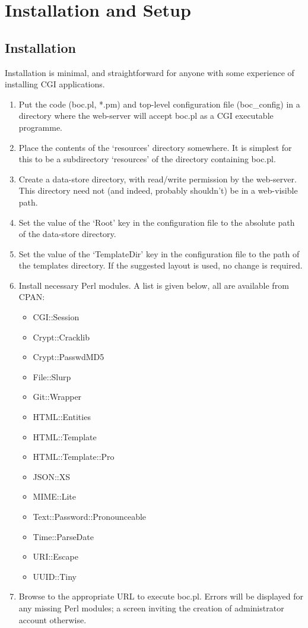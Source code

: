 \documentclass{report}
\begin{document}
\chapter{Installation and Setup}

\section{Installation}

Installation is minimal, and straightforward for anyone with some experience of installing CGI applications.

\begin{enumerate}
\item Put the code (boc.pl, *.pm) and top-level configuration file (boc\_config) in a directory where the web-server will accept boc.pl as a CGI executable programme.
\item Place the contents of the `resources' directory somewhere.  It is simplest for this to be a subdirectory `resources' of the directory containing boc.pl.
\item Create a data-store directory, with read/write permission by the web-server.  This directory need not (and indeed, probably shouldn't) be in a web-visible path.
\item Set the value of the `Root' key in the configuration file to the absolute path of the data-store directory.
\item Set the value of the `TemplateDir' key in the configuration file to the path of the templates directory.  If the suggested layout is used, no change is required.
\item Install necessary Perl modules.  A list is given below, all are available from CPAN:
	\begin{itemize}
	\item CGI::Session
	\item Crypt::Cracklib
	\item Crypt::PasswdMD5
	\item File::Slurp
	\item Git::Wrapper
	\item HTML::Entities
	\item HTML::Template
	\item HTML::Template::Pro
	\item JSON::XS
	\item MIME::Lite
	\item Text::Password::Pronounceable
	\item Time::ParseDate
	\item URI::Escape
	\item UUID::Tiny
	\end{itemize}
\item Browse to the appropriate URL to execute boc.pl.  Errors will be displayed for any missing Perl modules; a screen inviting the creation of administrator account otherwise.
\end{enumerate}
\end{document}
